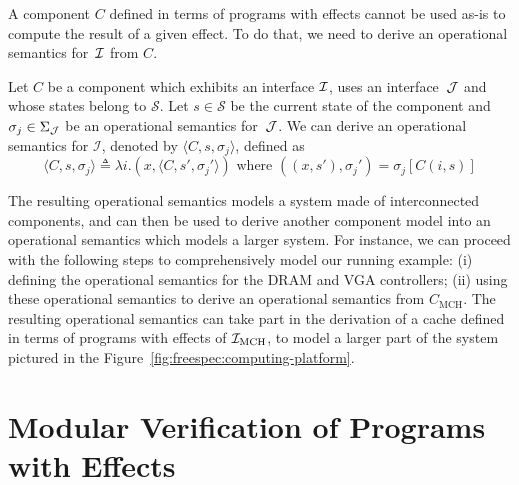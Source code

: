 A component $C$ defined in terms of programs with effects cannot be used as-is
to compute the result of a given effect.
%
To do that, we need to derive an operational semantics for~$\mathcal{I}$ from $C$.

\begin{definition} \label{def:freespec:derivation} Let $C$ be a component which
  exhibits an interface $\mathcal{I}$, uses an interface~$\mathcal{J}$ and whose states belong to
  $\mathcal{S}$.
  Let $s \in \mathcal{S}$ be the current state of the component and
  $\sigma_j \in \Sigma_{\mathcal{J}}$ be an operational semantics for~$\mathcal{J}$.
  We can derive an operational semantics for $\mathcal{I}$, denoted by
  $\langle C, s, \sigma_j \rangle$, defined as
  \[ \langle C, s, \sigma_j \rangle \triangleq \lambda i. (x, \langle C, s',
    \sigma_j' \rangle) \text{ where } ((x, s'), \sigma_j') = \sigma_j[C (i, s)]
  \]
\end{definition}

%
The resulting operational semantics models a system made of interconnected
components, and can then be used to derive another component model into an
operational semantics which models a larger system.
%
For instance, we can proceed with the following steps to comprehensively model
our running example: (i) defining the operational semantics for the DRAM and VGA
controllers; (ii) using these operational semantics to derive an operational
semantics from $C_{\mathrm{MCH}}$.
%
The resulting operational semantics can take part in the derivation of a cache
defined in terms of programs with effects of $\mathcal{I}_{\mathrm{MCH}}$, to model a
larger part of the system pictured in the
Figure~\ref{fig:freespec:computing-platform}.

\section{Modular Verification of Programs with Effects}
\label{sec:freespec:verifying}

